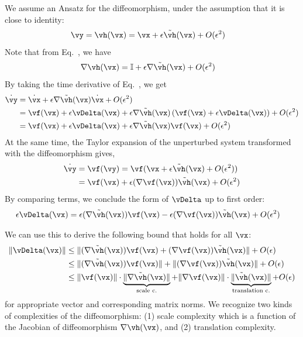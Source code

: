 \documentclass[a4paper,twoside]{article}
\renewcommand{\eqref}{Eq.~\originaleqref}
\newcounter{ct}
\DeclarePairedDelimiter{\norm}{\lVert}{\rVert}
\newcommand{\identity}{\ensuremath{\mathbb{I}}}
\newcommand{\homeo}{\vh}
\begin{document}
We assume an Ansatz for the diffeomorphism, under the assumption that it is close to identity:
\begin{align}\label{eq:h:ansatz}
    \vy &= \homeo(\vx) = \vx + \epsilon \tilde\homeo(\vx) + O(\epsilon^2)
\end{align}
Note that from \eqref{eq:h:ansatz}, we have
\begin{align}
    \nabla\vh(\vx) &= \identity + \epsilon\nabla\tilde\vh(\vx) + O(\epsilon^2)
\end{align}
By taking the time derivative of \eqref{eq:h:ansatz}, we get
\begin{align}
    \dot{\vy} &= \dot{\vx} + \epsilon \nabla\tilde\homeo(\vx)\dot{\vx} + O(\epsilon^2)
    \\
    &=
	\vf(\vx) + \epsilon \vDelta(\vx)
	+ \epsilon \nabla\tilde\homeo(\vx)
	\left(
	    \vf(\vx) + \epsilon \vDelta(\vx)
	\right)
	+ O(\epsilon^2)
    \\
    &=
	\vf(\vx) + \epsilon \vDelta(\vx)
	+ \epsilon \nabla\tilde\homeo(\vx)
	    \vf(\vx)
	+ O(\epsilon^2)
\end{align}
At the same time, the Taylor expansion of the unperturbed system transformed with the diffeomorphism gives,
\begin{align}
    \dot\vy &= \vf(\vy)
	= \vf(
	    \vx + \epsilon \tilde\homeo(\vx) + O(\epsilon^2)
	)
	\\
	&=
	    \vf(\vx) + \epsilon (\nabla\vf(\vx)) \tilde\homeo(\vx)
	    + O(\epsilon^2)
\end{align}
By comparing terms, we conclude the form of $\vDelta$ up to first order:
\begin{align}
    \epsilon \vDelta(\vx) &=
	\epsilon (\nabla\tilde\homeo(\vx)) \vf(\vx)
	-
	\epsilon (\nabla\vf(\vx)) \tilde\homeo(\vx)
	+ O(\epsilon^2)
\end{align}

We can use this to derive the following bound that holds for all $\vx$:
\begin{align}
    \norm{\vDelta(\vx)}
    &\leq
	\norm{(\nabla\tilde\homeo(\vx)) \vf(\vx)
	+
	(\nabla\vf(\vx)) \tilde\homeo(\vx)}
	+ O(\epsilon)
    \\
    &\leq
	\norm{(\nabla\tilde\homeo(\vx)) \vf(\vx)}
	+
	\norm{(\nabla\vf(\vx)) \tilde\homeo(\vx)}
	+ O(\epsilon)
    \\
    &\leq
	\norm{\vf(\vx)}
	\cdot
	\underbrace{
	    \norm{\nabla\tilde\homeo(\vx)}
	}_{\substack{\text{scale c.}}}
	+
	\norm{\nabla\vf(\vx)}
	\cdot
	\underbrace{
	\norm{\tilde\homeo(\vx)}
	}_{\substack{\text{translation c.}}}
	+ O(\epsilon)
    \label{eq:h:bound}
\end{align}
for appropriate vector and corresponding matrix norms.
We recognize two kinds of complexities of the diffeomorphism: (1) scale complexity which is a function of the Jacobian of diffeomorphism $\nabla\vh(\vx)$, and (2) translation complexity.
\end{document}
